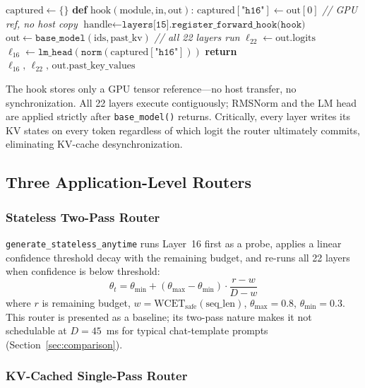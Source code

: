\documentclass[conference]{IEEEtran}
\begin{document}
\begin{algorithmic}[1]
\STATE $\text{captured} \leftarrow \{\}$
\STATE \textbf{def} $\text{hook}(\text{module}, \text{in}, \text{out})$:
\STATE \quad $\text{captured}[\texttt{"h16"}] \leftarrow \text{out}[0]$
       \hfill\textit{// GPU ref, no host copy}
\STATE $\text{handle} \leftarrow \texttt{layers[15].register\_forward\_hook(hook)}$
\STATE $\text{out} \leftarrow \texttt{base\_model}(\text{ids}, \text{past\_kv})$
       \hfill\textit{// all 22 layers run}
\STATE $\ell_{22} \leftarrow \text{out.logits}$
\STATE $\ell_{16} \leftarrow \texttt{lm\_head}(\texttt{norm}(\text{captured}[\texttt{"h16"}]))$
\STATE \textbf{return} $\ell_{16},\, \ell_{22},\, \text{out.past\_key\_values}$
\end{algorithmic}

The hook stores only a GPU tensor reference---no host transfer, no
synchronization.
All 22 layers execute contiguously; RMSNorm and the LM head are applied
strictly after \texttt{base\_model()} returns.
Critically, every layer writes its KV states on every token regardless
of which logit the router ultimately commits, eliminating KV-cache
desynchronization.

\subsection{Three Application-Level Routers}

\subsubsection{Stateless Two-Pass Router}

\texttt{generate\_stateless\_anytime} runs Layer~16 first as a probe,
applies a linear confidence threshold decay with the remaining budget,
and re-runs all 22 layers when confidence is below threshold:
\begin{equation}
\theta_t = \theta_{\min} + (\theta_{\max} - \theta_{\min})
           \cdot \frac{r - w}{D - w}
\label{eq:decay}
\end{equation}
where $r$ is remaining budget, $w = \text{WCET}_{\text{safe}}(\text{seq\_len})$,
$\theta_{\max}=0.8$, $\theta_{\min}=0.3$.
This router is presented as a baseline; its two-pass nature makes it
not schedulable at $D=45$~ms for typical chat-template prompts
(Section~\ref{sec:comparison}).

\subsubsection{KV-Cached Single-Pass Router}
\end{document}
